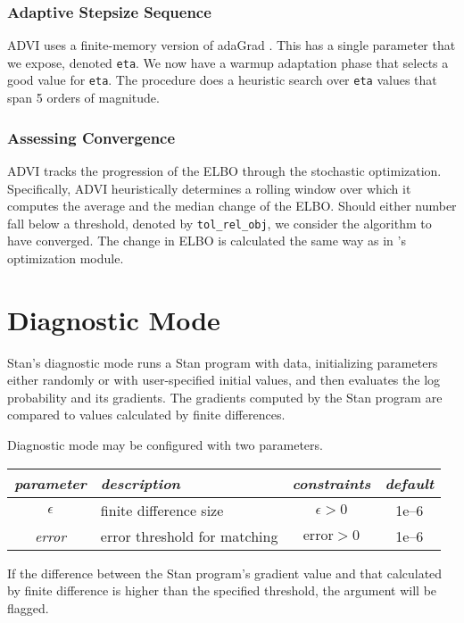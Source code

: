 \subsection{Adaptive Stepsize Sequence}

ADVI uses a finite-memory version of adaGrad \citep{Duchi:2011}. This
has a single parameter that we expose, denoted \texttt{eta}. We now
have a warmup adaptation phase that selects a good value for
\texttt{eta}. The procedure does a heuristic search over \texttt{eta}
values that span 5 orders of magnitude.

\subsection{Assessing Convergence}

ADVI tracks the progression of the ELBO through the stochastic
optimization.  Specifically, ADVI heuristically determines a rolling
window over which it computes the average and the median change of the
ELBO. Should either number fall below a threshold, denoted by
\texttt{tol\_rel\_obj}, we consider the algorithm to have
converged. The change in ELBO is calculated the same way as in \Stan's
optimization module.


\chapter{Diagnostic Mode}\label{diagnostic-algorithms.chapter}

\noindent
Stan's diagnostic mode runs a Stan program with data, initializing
parameters either randomly or with user-specified initial values, and
then evaluates the log probability and its gradients. The gradients
computed by the Stan program are compared to values calculated by
finite differences.

Diagnostic mode may be configured with two parameters.
%
\begin{center}
\begin{tabular}{c|lcc}
{\it parameter} & {\it description} & {\it constraints} & {\it
  default}
\\ \hline
{\it $\epsilon$} & finite difference size & $\epsilon > 0$ & 1e--6
\\
{\it error} & error threshold for matching & $\mbox{error} > 0$ & 1e--6
\end{tabular}
\end{center}
%
If the difference between the Stan program's gradient value and that
calculated by finite difference is higher than the specified
threshold, the argument will be flagged.

